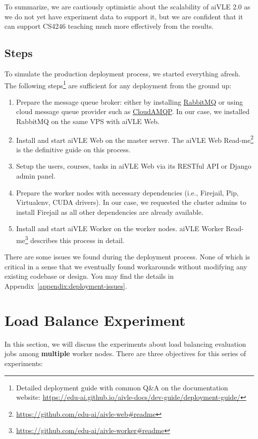 To summarize, we are cautiously optimistic about the scalability of aiVLE 2.0 as we do not yet have experiment data to support it, but we are confident that it can support CS4246 teaching much more effectively from the results.

\subsection{Steps}
To simulate the production deployment process, we started everything afresh. The following steps\footnote{Detailed deployment guide with common Q\&A on the documentation website: \href{https://edu-ai.github.io/aivle-docs/dev-guide/deployment-guide/}{https://edu-ai.github.io/aivle-docs/dev-guide/deployment-guide/}} are sufficient for any deployment from the ground up:

\begin{enumerate}
    \item Prepare the message queue broker: either by installing \href{https://www.rabbitmq.com/}{RabbitMQ} or using cloud message queue provider such as \href{https://www.cloudamqp.com/}{CloudAMQP}. In our case, we installed RabbitMQ on the same VPS with aiVLE Web.
    \item Install and start aiVLE Web on the master server.  The aiVLE Web Read-me\footnote{\href{https://github.com/edu-ai/aivle-web\#readme}{https://github.com/edu-ai/aivle-web\#readme}} is the definitive guide on this process.
    \item Setup the users, courses, tasks in aiVLE Web via its RESTful API or Django admin panel.
    \item Prepare the worker nodes with necessary dependencies (i.e., Firejail, Pip, Virtualenv, CUDA drivers). In our case, we requested the cluster admins to install Firejail as all other dependencies are already available.
    \item Install and start aiVLE Worker on the worker nodes. aiVLE Worker Read-me\footnote{\href{https://github.com/edu-ai/aivle-worker\#readme}{https://github.com/edu-ai/aivle-worker\#readme}} describes this process in detail.
\end{enumerate}

There are some issues we found during the deployment process. None of which is critical in a sense that we eventually found workarounds without modifying any existing codebase or design. You may find the details in Appendix~\ref{appendix:deployment-issues}.

\section{Load Balance Experiment}
\label{s:load-balance-exp}
In this section, we will discuss the experiments about load balancing evaluation jobs among \textbf{multiple} worker nodes. There are three objectives for this series of experiments:

